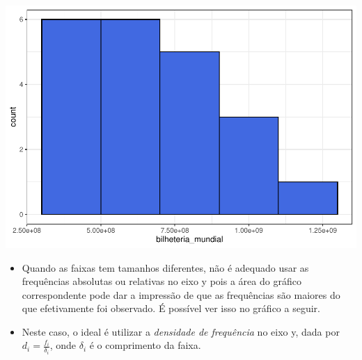\documentclass[
]{book}
\providecommand{\tightlist}{%
  \setlength{\itemsep}{0pt}\setlength{\parskip}{0pt}}
\begin{document}
\begin{center}\includegraphics{AED_files/figure-latex/hist_bilheteria1-1} \end{center}

\begin{itemize}
\tightlist
\item
  Quando as faixas tem tamanhos diferentes, não é adequado usar as frequências absolutas ou relativas no eixo y pois a área do gráfico correspondente pode dar a impressão de que as frequências são maiores do que efetivamente foi observado. É possível ver isso no gráfico a seguir.\\
\item
  Neste caso, o ideal é utilizar a \emph{densidade de frequência} no eixo y, dada por \(d_i = \frac{f_i}{\delta_i}\), onde \(\delta_i\) é o comprimento da faixa.
\end{itemize}
\end{document}
